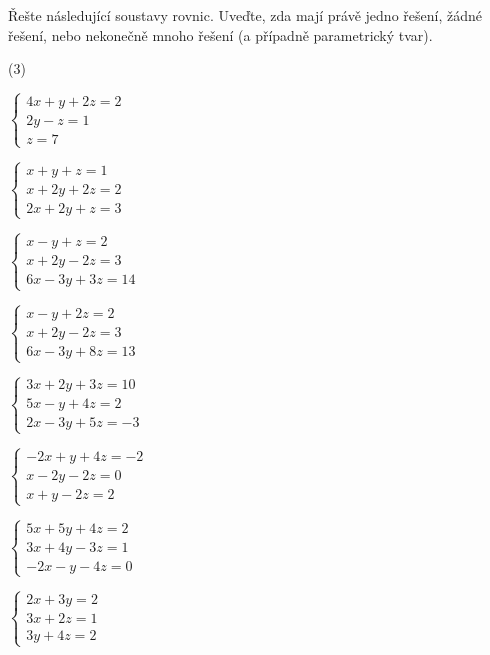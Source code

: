 \documentclass[12pt,a4paper]{article}
\begin{document}
\begin{exercise}
Řešte následující soustavy rovnic. Uveďte, zda mají právě jedno řešení, žádné řešení, nebo nekonečně mnoho řešení (a případně parametrický tvar).
\begin{tasks}(3)

\task $\begin{cases}
4x + y + 2z = 2\\
2y - z = 1\\
z = 7
\end{cases}$

\task $\begin{cases}
x + y + z = 1\\
x + 2y + 2z = 2\\
2x + 2y + z = 3
\end{cases}$

\task $\begin{cases}
x - y + z = 2\\
x + 2y - 2z = 3\\
6x - 3y + 3z = 14
\end{cases}$

\task $\begin{cases}
x - y + 2z = 2\\
x + 2y - 2z = 3\\
6x - 3y + 8z = 13
\end{cases}$

\task $\begin{cases}
3x + 2y + 3z = 10\\
5x - y + 4z = 2\\
2x - 3y + 5z = -3
\end{cases}$

\task $\begin{cases}
-2x + y + 4z = -2\\
x - 2y - 2z = 0\\
x + y - 2z = 2
\end{cases}$

\task $\begin{cases}
5x + 5y + 4z = 2\\
3x + 4y - 3z = 1\\
-2x - y - 4z = 0
\end{cases}$

\task $\begin{cases}
2x + 3y = 2\\
3x + 2z = 1\\
3y + 4z = 2
\end{cases}$


\end{tasks}
\end{exercise}
\end{document}
